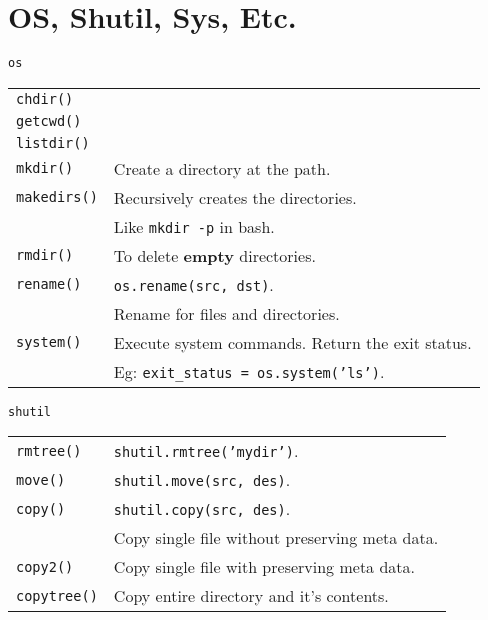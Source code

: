 \section{OS, Shutil, Sys, Etc.}

\begin{center}
    \large{\texttt{os}}\\
\end{center}

\begin{tabularx}{\linewidth}{lX}
   \texttt{chdir()}           & \\
   \texttt{getcwd()}          & \\
   \texttt{listdir()}         & \\
   \texttt{mkdir()}           & Create a directory at the path.\\
   \texttt{makedirs()}        & Recursively creates the directories.\\
                            & Like \texttt{mkdir -p} in bash.\\
   \texttt{rmdir()}           & To delete \textbf{empty} directories.\\
   \texttt{rename()}          & \texttt{os.rename(src, dst)}.\\
                            & Rename for files and directories.\\
    \hline
    \texttt{system()}         & Execute system commands. Return the exit status.\\
                            & Eg: \texttt{exit\_status = os.system('ls')}.\\
\hline
\end{tabularx}

\begin{center}
    \large{\texttt{shutil}}\\
\end{center}

\begin{tabularx}{\linewidth}{lX}
    \texttt{rmtree()}         & \texttt{shutil.rmtree('mydir')}.\\
    \texttt{move()}           & \texttt{shutil.move(src, des)}.\\
    \texttt{copy()}           & \texttt{shutil.copy(src, des)}.\\
                            & Copy single file without preserving meta data.\\
    \texttt{copy2()}          & Copy single file with preserving meta data.\\
    \texttt{copytree()}       & Copy entire directory and it's contents.\\
\hline
\end{tabularx}

